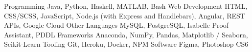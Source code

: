 \begin{cvskills}
  \cvskill
    {Programming} %
    {Java, Python, Haskell, MATLAB, Bash} %
  \cvskill
    {Web Development} %
    {HTML, CSS/SCSS, JavaScript, Node.js (with Express and Handlebars), Angular, REST APIs, Google Cloud}
  \cvskill
    {Other Languages} %
    {MySQL, PostgreSQL, Isabelle Proof Assistant, PDDL}
  \cvskill
    {Frameworks} %
    {Anaconda, NumPy, Pandas, Matplotlib / Seaborn, Scikit-Learn}
  \cvskill
    {Tooling} %
    {Git, Heroku, Docker, NPM}
  \cvskill
    {Software} %
    {Figma, Photoshop CS6}
\end{cvskills}

